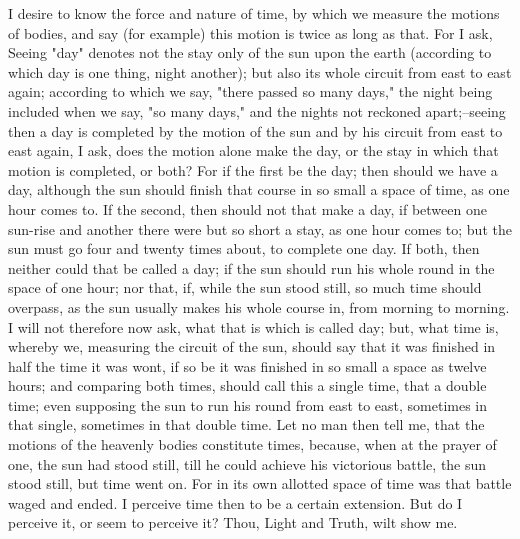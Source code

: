 \documentclass[b5paper,openright,12pt,twoside]{book}
\begin{document}
I desire to know the force and nature of time, by which we measure the
motions of bodies, and say (for example) this motion is twice as long as
that. For I ask, Seeing "day" denotes not the stay only of the sun upon
the earth (according to which day is one thing, night another); but also
its whole circuit from east to east again; according to which we say,
"there passed so many days," the night being included when we say, "so
many days," and the nights not reckoned apart;--seeing then a day is
completed by the motion of the sun and by his circuit from east to east
again, I ask, does the motion alone make the day, or the stay in which
that motion is completed, or both? For if the first be the day; then
should we have a day, although the sun should finish that course in so
small a space of time, as one hour comes to. If the second, then should
not that make a day, if between one sun-rise and another there were
but so short a stay, as one hour comes to; but the sun must go four and
twenty times about, to complete one day. If both, then neither could
that be called a day; if the sun should run his whole round in the
space of one hour; nor that, if, while the sun stood still, so much
time should overpass, as the sun usually makes his whole course in, from
morning to morning. I will not therefore now ask, what that is which is
called day; but, what time is, whereby we, measuring the circuit of the
sun, should say that it was finished in half the time it was wont, if
so be it was finished in so small a space as twelve hours; and comparing
both times, should call this a single time, that a double time; even
supposing the sun to run his round from east to east, sometimes in that
single, sometimes in that double time. Let no man then tell me, that the
motions of the heavenly bodies constitute times, because, when at
the prayer of one, the sun had stood still, till he could achieve his
victorious battle, the sun stood still, but time went on. For in its own
allotted space of time was that battle waged and ended. I perceive
time then to be a certain extension. But do I perceive it, or seem to
perceive it? Thou, Light and Truth, wilt show me.
\end{document}
